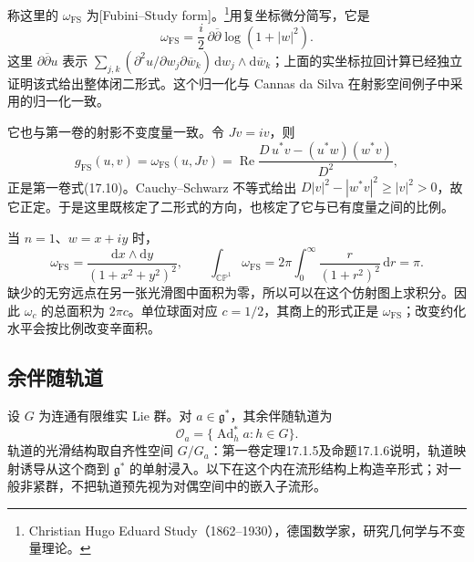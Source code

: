称这里的 \(\omega_{\mathrm{FS}}\) 为[Fubini--Study form]。\footnote{Christian Hugo Eduard Study（1862--1930），德国数学家，研究几何学与不变量理论。}用复坐标微分简写，它是
\[
	\omega_{\mathrm{FS}}=\frac{i}{2}\,\partial\overline\partial\log(1+|w|^2).
\]
这里 \(\partial\overline\partial u\) 表示
\(\sum_{j,k}(\partial^2u/\partial w_j\partial\overline w_k)
\,\mathrm{d}w_j\wedge\mathrm{d}\overline w_k\)；上面的实坐标拉回计算已经独立证明该式给出整体闭二形式。这个归一化与 Cannas da Silva 在射影空间例子中采用的归一化一致。\cite[第3.4节，第119--120页]{Cannas2006Symplectic}

\ProseParagraphBreak

它也与第一卷的射影不变度量一致。令 \(Jv=iv\)，则
\[
	g_{\mathrm{FS}}(u,v)=\omega_{\mathrm{FS}}(u,Jv)
	=\operatorname{Re}
	\frac{D\,u^*v-(u^*w)(w^*v)}{D^2},
\]
正是第一卷式(17.10)。Cauchy--Schwarz 不等式给出
\(D|v|^2-|w^*v|^2\ge |v|^2>0\)，故它正定。于是这里既核定了二形式的方向，也核定了它与已有度量之间的比例。

\begin{example}\label{g4:exm:1003:projective-line-area}
	当 \(n=1\)、\(w=x+iy\) 时，
	\[
		\omega_{\mathrm{FS}}
		=\frac{\mathrm{d}x\wedge\mathrm{d}y}{(1+x^2+y^2)^2},
		\qquad
		\int_{\mathbb{CP}^1}\omega_{\mathrm{FS}}
		=2\pi\int_0^\infty\frac{r}{(1+r^2)^2}\,\mathrm{d}r=\pi.
	\]
	缺少的无穷远点在另一张光滑图中面积为零，所以可以在这个仿射图上求积分。因此 \(\omega_c\) 的总面积为 \(2\pi c\)。单位球面对应 \(c=1/2\)，其商上的形式正是 \(\omega_{\mathrm{FS}}\)；改变约化水平会按比例改变辛面积。
\end{example}

\subsection{余伴随轨道}
\label{g4:subsec:1003:03}

设 \(G\) 为连通有限维实 Lie 群。对 \(a\in\mathfrak g^*\)，其余伴随轨道为
\[
	\mathcal O_a=\{\operatorname{Ad}_h^*a:h\in G\}.
\]
轨道的光滑结构取自齐性空间 \(G/G_a\)：第一卷定理17.1.5及命题17.1.6说明，轨道映射诱导从这个商到 \(\mathfrak g^*\) 的单射浸入。以下在这个内在流形结构上构造辛形式；对一般非紧群，不把轨道预先视为对偶空间中的嵌入子流形。

\ProseParagraphBreak


